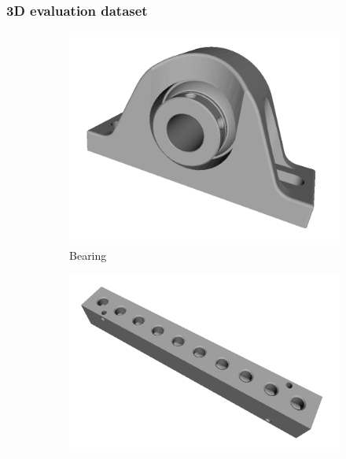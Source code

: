
\subsubsection{3D evaluation dataset}

\begin{figure}[t]
	\centering
	\begin{subfigure}[b]{0.16\linewidth} \centering
		\includegraphics[width=1\linewidth]{./fig/eval/toshiba_bearing1.png}
		\caption{Bearing}
	\end{subfigure}
	\begin{subfigure}[b]{0.16\linewidth} \centering
		\includegraphics[width=1\linewidth]{./fig/eval/toshiba_block1.png}

\end{subfigure}
\end{figure}

